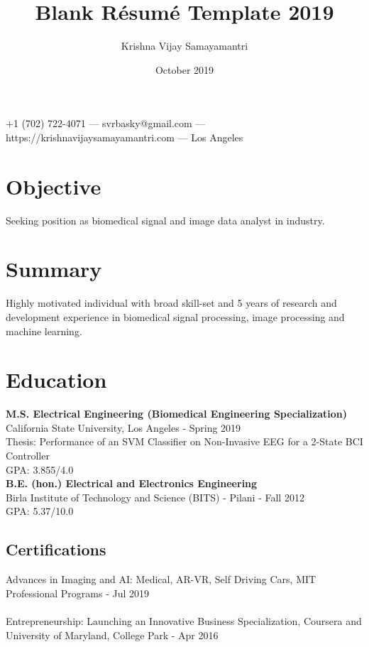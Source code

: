 \documentclass{article}
\makeatletter
\renewcommand{\maketitle}{
\begin{center}
    {\huge\bfseries
    \theauthor}
    
    \vspace{.25em}
    +1 (702) 722-4071 ---
    svrbasky@gmail.com --- https://krishnavijaysamayamantri.com ---
    Los Angeles
\end{center}
}
\makeatother
\begin{document}
\title{Blank R\'esum\'e Template 2019}
\author{Krishna Vijay Samayamantri}
\date{October 2019}
\maketitle


\section{Objective}
Seeking position as biomedical signal and image data analyst in industry.

\section{Summary}
Highly motivated individual with broad skill-set and 5 years of research and development experience in biomedical signal processing, image processing and machine learning. 

\section{Education}
\textbf{M.S. Electrical Engineering (Biomedical Engineering Specialization)}\\
\noindent   
California State University, Los Angeles \hfill - Spring 2019\\
\noindent   
Thesis: Performance of an SVM Classifier on Non-Invasive EEG for a 2-State BCI Controller \\
\noindent
GPA: 3.855/4.0 \\


\noindent
\textbf{B.E. (hon.) Electrical and Electronics Engineering}\\
\noindent
Birla Institute of Technology and Science (BITS) - Pilani \hfill - Fall 2012 \\
\noindent
GPA: 5.37/10.0

\subsection{Certifications}
Advances in Imaging and AI: Medical, AR-VR, Self Driving Cars, MIT Professional Programs \hfill - Jul 2019 \\
\\
\noindent
Entrepreneurship: Launching an Innovative Business Specialization, Coursera and University of Maryland, College Park \hfill - Apr 2016
\end{document}
